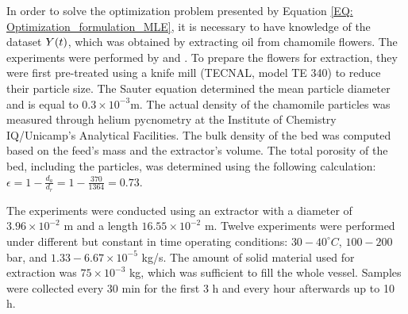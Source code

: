 \documentclass[../Article_Model_Parameters.tex]{subfiles}
\begin{document}
	
	\label{CH: Experiments}
	
	In order to solve the optimization problem presented by Equation \ref{EQ: Optimization_formulation_MLE}, it is necessary to have knowledge of the dataset ${\color{black}Y}(t)$, which was obtained by extracting oil from chamomile flowers. The experiments were performed by \citet{Povh2001} and \citet{Rahimi2011}. To prepare the flowers for extraction, they were first pre-treated using a knife mill (TECNAL, model TE 340) to reduce their particle size. The Sauter equation determined the mean particle diameter and is equal to $0.3\times 10^{-3}$m. The actual density of the chamomile particles was measured through helium pycnometry at the Institute of Chemistry IQ/Unicamp's Analytical Facilities. The bulk density of the bed was computed based on the feed's mass and the extractor's volume. The total porosity of the bed, including the particles, was determined using the following calculation: $\epsilon=1-\frac{d_a}{d_r} = 1-\frac{370}{1364} = 0.73$.
	
	
	The experiments were conducted using an extractor with a diameter of $3.96\times 10^{-2}$ m and a length $16.55\times 10^{-2}$ m. Twelve experiments were performed under different but constant in time operating conditions: $30-40^\circ C$, $100 - 200$ bar, and $1.33-6.67 \times 10^{-5}$ kg/s. The amount of solid material used for extraction was $75\times 10^{-3}$ kg, which was sufficient to fill the whole vessel. Samples were collected every 30 min for the first 3 h and every hour afterwards up to 10 h. 
	
		
\end{document}
